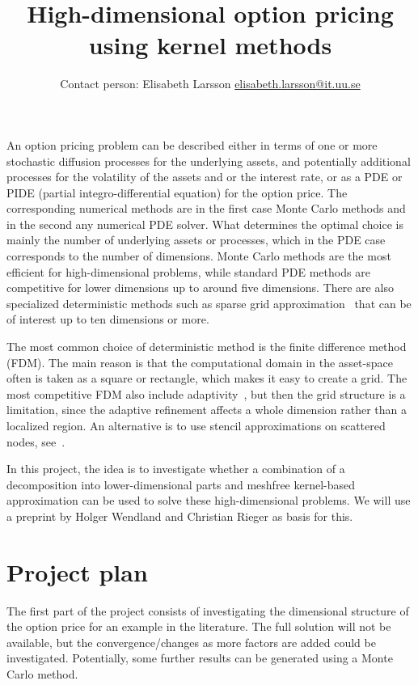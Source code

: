 \documentclass{article}
\title{High-dimensional option pricing using kernel methods}
\author{Contact person: Elisabeth Larsson \url{elisabeth.larsson@it.uu.se}}
\begin{document}
\maketitle
An option pricing problem can be described either in terms of one or more stochastic diffusion processes for the underlying assets, and potentially additional processes for the volatility of the assets and or the interest rate, or as a PDE or PIDE (partial integro-differential equation) for the option price. The corresponding numerical methods are in the first case Monte Carlo methods and in the second any numerical PDE solver. What determines the optimal choice is mainly the number of underlying assets or processes, which in the PDE case corresponds to the number of dimensions. Monte Carlo methods are the most efficient for high-dimensional problems, while standard PDE methods are competitive for lower dimensions up to around five dimensions. There are also specialized deterministic methods such as sparse grid approximation~\cite{hilber2010wavelet,lopez2018pde} that can be of interest up to ten dimensions or more.

The most common choice of deterministic method is the finite difference method (FDM). The main reason is that the computational domain in the asset-space often is taken as a square or rectangle, which makes it easy to create a grid. The most competitive FDM also include adaptivity~\cite{vonSydow13,Salmi14a}, but then the grid structure is a limitation, since the adaptive refinement affects a whole dimension rather than a localized region. An alternative is to use stencil approximations on scattered nodes, see~\cite{milovanovic2020high}. 

In this project, the idea is to investigate whether a combination of a decomposition into lower-dimensional parts and meshfree kernel-based approximation can be used to solve these high-dimensional problems. We will use a preprint by Holger Wendland and Christian Rieger as basis for this.

\section*{Project plan}
The first part of the project consists of investigating the dimensional structure of the option price for an example in the literature. The full solution will not be available, but the convergence/changes as more factors are added could be investigated. Potentially, some further results can be generated using a Monte Carlo method.
\end{document}
